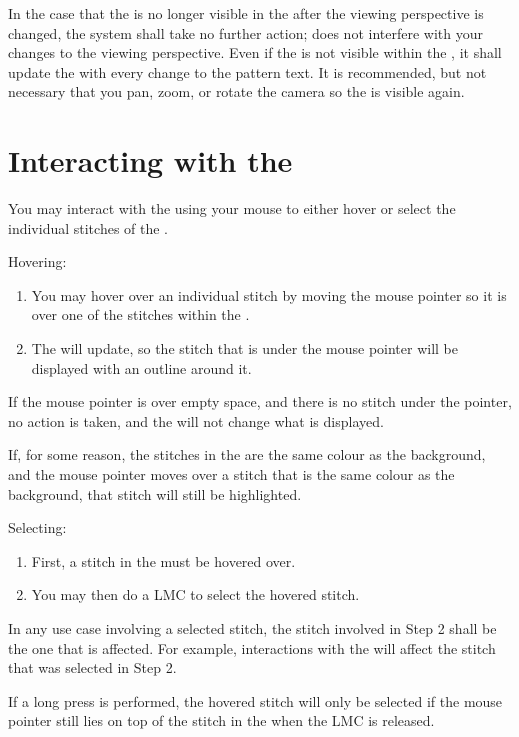 \documentclass[main.tex]{subfiles}
\begin{document}
In the case that the \RM{} is no longer visible in the \CRW{} after the viewing perspective is changed, the \CC{} system shall take no further action; \CC{} does not interfere with your changes to the viewing perspective. Even if the \RM{} is not visible within the \CRW, it shall update the \RM{} with every change to the pattern text. It is recommended, but not necessary that you pan, zoom, or rotate the camera so the \RM{} is visible again.

\section{Interacting with the \RM}\label{sec:interactrm}

You may interact with the \RM*{} using your mouse to either hover or select the individual stitches of the \RM.

Hovering:
\begin{enumerate}
\item You may hover over an individual stitch by moving the mouse pointer so it is over one of the stitches within the \RM.
\item The \CRW{} will update, so the stitch that is under the mouse pointer will be displayed with an outline around it.
\end{enumerate}

If the mouse pointer is over empty space, and there is no stitch under the pointer, no action is taken, and the \CRW{} will not change what is displayed.

If, for some reason, the stitches in the \RM{} are the same colour as the background, and the mouse pointer moves over a stitch that is the same colour as the background, that stitch will still be highlighted.

Selecting:
\begin{enumerate}
\item First, a stitch in the \RM{} must be hovered over. 
\item You may then do a LMC to select the hovered stitch. 
\end{enumerate}

In any use case involving a selected stitch, the stitch involved in Step 2 shall be the one that is affected. For example, interactions with the \PropSidebar* will affect the stitch that was selected in Step 2.

If a long press is performed, the hovered stitch will only be selected if the mouse pointer still lies on top of the stitch in the \RM{} when the LMC is released.
\end{document}
